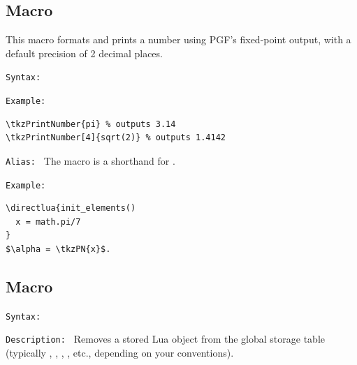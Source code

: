 \subsection{Macro }
This macro formats and prints a number using PGF’s fixed-point output, with a default precision of 2 decimal places.

\medskip

\texttt{Syntax: }
\begin{quote}
 \qquad
{}
\end{quote}

\texttt{Example: }

\begin{mybox}
\begin{verbatim}
\tkzPrintNumber{pi} % outputs 3.14
\tkzPrintNumber[4]{sqrt(2)} % outputs 1.4142
\end{verbatim}
\end{mybox}

\texttt{Alias: } The macro  is a shorthand for .


\texttt{Example: }
\begin{minipage}{.52\textwidth}
\begin{verbatim}
\directlua{init_elements()
  x = math.pi/7
}
$\alpha = \tkzPN{x}$.
\end{verbatim}
\end{minipage}


\subsection{Macro }

\label{sub:macro_tkzEraseLuaObj}

\texttt{Syntax: }
\begin{quote}
\end{quote}



\texttt{Description: }
Removes a stored Lua object from the global storage table (typically ,
, , , etc., depending on your conventions).


